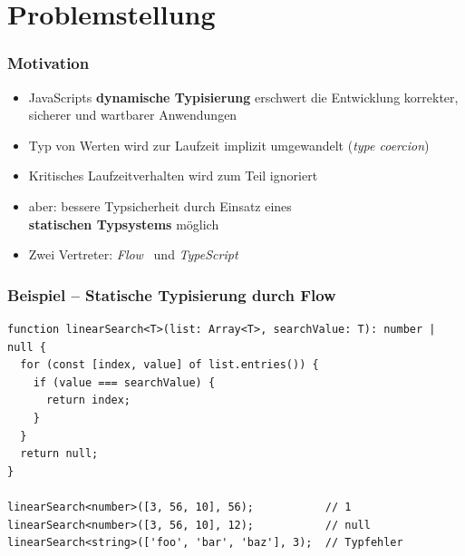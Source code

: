 


  \frame[plain]{\titlepage}


  \section{Problemstellung}

    \begin{frame}
      \frametitle{Motivation}
      \begin{itemize}
        \item JavaScripts \textbf{dynamische Typisierung} erschwert die Entwicklung korrekter, sicherer und wartbarer Anwendungen~\autocite{NIKHIL:2014,PRADEL:2015,BIERMAN:2014}
        \item Typ von Werten wird zur Laufzeit implizit umgewandelt (\textit{type coercion})
        \item Kritisches Laufzeitverhalten wird zum Teil ignoriert
        \item aber: bessere Typsicherheit durch Einsatz eines\\\textbf{statischen Typsystems} möglich
        \item Zwei Vertreter: \textit{Flow}~\autocite{FLOW:PAPER} und \textit{TypeScript}~\autocite{TYPESCRIPT:SPEC}
      \end{itemize}
    \end{frame}

    \begin{frame}[fragile]
      \frametitle{Beispiel -- Statische Typisierung durch Flow}
      \begin{lstlisting}
function linearSearch<T>(list: Array<T>, searchValue: T): number | null {
  for (const [index, value] of list.entries()) {
    if (value === searchValue) {
      return index;
    }
  }
  return null;
}

linearSearch<number>([3, 56, 10], 56);           // 1
linearSearch<number>([3, 56, 10], 12);           // null
linearSearch<string>(['foo', 'bar', 'baz'], 3);  // Typfehler
      \end{lstlisting}
    \end{frame}

